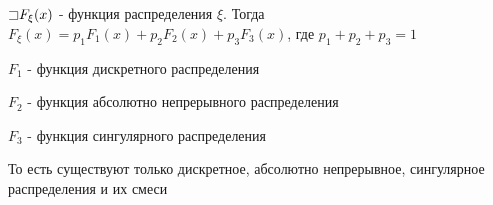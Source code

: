 \documentclass[12pt]{article}
\begin{document}
    \hypertarget{lebesguetheorem}{}

    \begin{MyTheorem}

        $\mathord{\sqsupset} F_\xi(x)$ - функция распределения $\xi$. Тогда $F_\xi(x) = p_1 F_1(x) + p_2 F_2(x) + p_3 F_3(x)$, где $p_1 + p_2 + p_3 = 1$

        $F_1$ - функция дискретного распределения

        $F_2$ - функция абсолютно непрерывного распределения

        $F_3$ - функция сингулярного распределения

        То есть существуют только дискретное, абсолютно непрерывное, сингулярное распределения и их смеси
    \end{MyTheorem}
\end{document}
